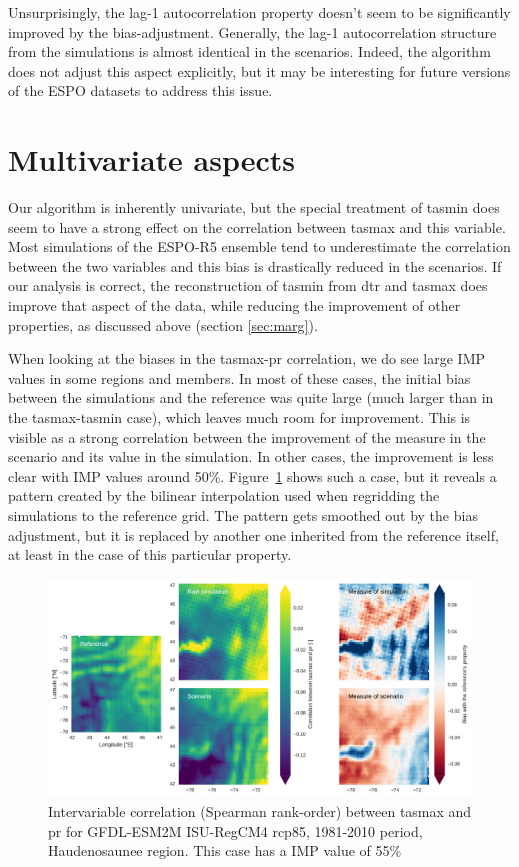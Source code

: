 \documentclass[letterpaper,10pt]{article}
\begin{document}
Unsurprisingly, the lag-1 autocorrelation property doesn't seem to be significantly improved by the bias-adjustment.
Generally, the lag-1 autocorrelation structure from the simulations is almost identical in the scenarios.
Indeed, the algorithm does not adjust this aspect explicitly, but it may be interesting for future versions of the ESPO datasets to address this issue.

\section{Multivariate aspects}
Our algorithm is inherently univariate, but the special treatment of tasmin does seem to have a strong effect on the correlation between tasmax and this variable.
Most simulations of the ESPO-R5 ensemble tend to underestimate the correlation between the two variables and this bias is drastically reduced in the scenarios.
If our analysis is correct, the reconstruction of tasmin from dtr and tasmax does improve that aspect of the data, while reducing the improvement of other properties, as discussed above (section \ref{sec:marg}).

When looking at the biases in the tasmax-pr correlation, we do see large IMP values in some regions and members.
In most of these cases, the initial bias between the simulations and the reference was quite large (much larger than in the tasmax-tasmin case), which leaves much room for improvement.
This is visible as a strong correlation between the improvement of the measure in the scenario and its value in the simulation.
In other cases, the improvement is less clear with IMP values around 50\%.
Figure~\ref{fig:icorr} shows such a case, but it reveals a pattern created by the bilinear interpolation used when regridding the simulations to the reference grid.
The pattern gets smoothed out by the bias adjustment, but it is replaced by another one inherited from the reference itself, at least in the case of this particular property.

\begin{figure}
    \centering
    \includegraphics[width=\textwidth]{../images/corr_tasmax_pr_diags.pdf}
    \caption{Intervariable correlation (Spearman rank-order) between tasmax and pr for GFDL-ESM2M ISU-RegCM4 rcp85, 1981-2010 period, Haudenosaunee region. This case has a IMP value of 55\%}\label{fig:icorr}
\end{figure}
\end{document}
